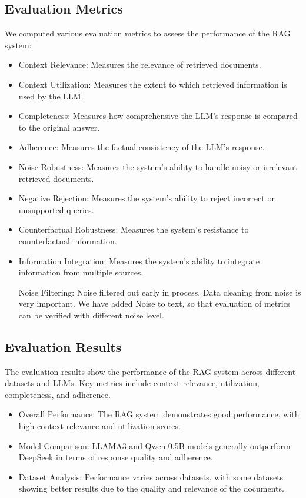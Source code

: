 \documentclass{article}
\begin{document}
\subsection{Evaluation Metrics}

We computed various evaluation metrics to assess the performance of the RAG system:
\begin{itemize}
    \item Context Relevance: Measures the relevance of retrieved documents.
    \item Context Utilization: Measures the extent to which retrieved information is used by the LLM.
    \item Completeness: Measures how comprehensive the LLM's response is compared to the original answer.
    \item Adherence: Measures the factual consistency of the LLM's response.
    \item Noise Robustness: Measures the system's ability to handle noisy or irrelevant retrieved documents.
    \item Negative Rejection: Measures the system's ability to reject incorrect or unsupported queries.
    \item Counterfactual Robustness: Measures the system's resistance to counterfactual information.
    \item Information Integration: Measures the system's ability to integrate information from multiple sources.

    Noise Filtering: Noise filtered out early in process. Data cleaning from noise is very important. We have added Noise to text, so that evaluation of metrics can be verified with different noise level.
    
\end{itemize}

\subsection{Evaluation Results}

The evaluation results show the performance of the RAG system across different datasets and LLMs. Key metrics include context relevance, utilization, completeness, and adherence.
\begin{itemize}
    \item Overall Performance: The RAG system demonstrates good performance, with high context relevance and utilization scores.
    \item Model Comparison: LLAMA3 and Qwen 0.5B models generally outperform DeepSeek in terms of response quality and adherence.
    \item Dataset Analysis: Performance varies across datasets, with some datasets showing better results due to the quality and relevance of the documents.
\end{itemize}
\end{document}
